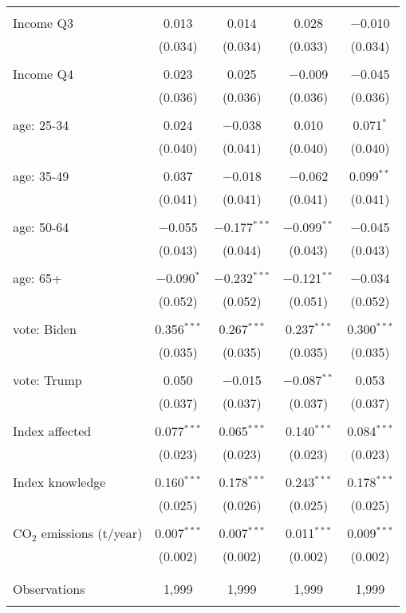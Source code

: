 \begin{tabular}{@{\extracolsep{5pt}}lcccc}
  & & & & \\ 
 Income Q3 & 0.013 & 0.014 & 0.028 & $-$0.010 \\ 
  & (0.034) & (0.034) & (0.033) & (0.034) \\ 
  & & & & \\ 
 Income Q4 & 0.023 & 0.025 & $-$0.009 & $-$0.045 \\ 
  & (0.036) & (0.036) & (0.036) & (0.036) \\ 
  & & & & \\ 
 age: 25-34 & 0.024 & $-$0.038 & 0.010 & 0.071$^{*}$ \\ 
  & (0.040) & (0.041) & (0.040) & (0.040) \\ 
  & & & & \\ 
 age: 35-49 & 0.037 & $-$0.018 & $-$0.062 & 0.099$^{**}$ \\ 
  & (0.041) & (0.041) & (0.041) & (0.041) \\ 
  & & & & \\ 
 age: 50-64 & $-$0.055 & $-$0.177$^{***}$ & $-$0.099$^{**}$ & $-$0.045 \\ 
  & (0.043) & (0.044) & (0.043) & (0.043) \\ 
  & & & & \\ 
 age: 65+ & $-$0.090$^{*}$ & $-$0.232$^{***}$ & $-$0.121$^{**}$ & $-$0.034 \\ 
  & (0.052) & (0.052) & (0.051) & (0.052) \\ 
  & & & & \\ 
 vote: Biden & 0.356$^{***}$ & 0.267$^{***}$ & 0.237$^{***}$ & 0.300$^{***}$ \\ 
  & (0.035) & (0.035) & (0.035) & (0.035) \\ 
  & & & & \\ 
 vote: Trump & 0.050 & $-$0.015 & $-$0.087$^{**}$ & 0.053 \\ 
  & (0.037) & (0.037) & (0.037) & (0.037) \\ 
  & & & & \\ 
 Index affected & 0.077$^{***}$ & 0.065$^{***}$ & 0.140$^{***}$ & 0.084$^{***}$ \\ 
  & (0.023) & (0.023) & (0.023) & (0.023) \\ 
  & & & & \\ 
 Index knowledge & 0.160$^{***}$ & 0.178$^{***}$ & 0.243$^{***}$ & 0.178$^{***}$ \\ 
  & (0.025) & (0.026) & (0.025) & (0.025) \\ 
  & & & & \\ 
 CO$_{2}$ emissions (t/year) & 0.007$^{***}$ & 0.007$^{***}$ & 0.011$^{***}$ & 0.009$^{***}$ \\ 
  & (0.002) & (0.002) & (0.002) & (0.002) \\ 
  & & & & \\ 
\hline \\[-1.8ex] 

Observations & 1,999 & 1,999 & 1,999 & 1,999 \\ 
\hline 
\hline \\[-1.8ex] 
\end{tabular} 